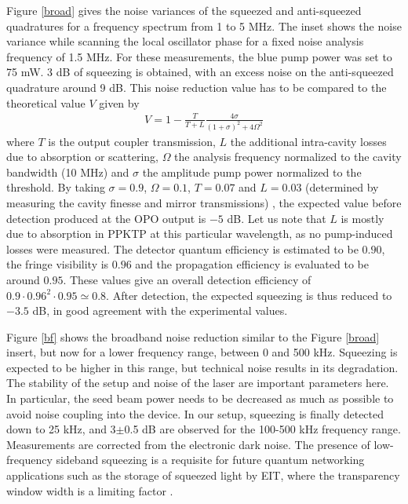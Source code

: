 Figure \ref{broad} gives the noise variances of the squeezed and anti-squeezed quadratures for a frequency spectrum from 1 to 5 MHz.  The inset shows the noise variance while
scanning the local oscillator phase for a fixed noise analysis frequency of 1.5 MHz. For these measurements, the blue pump power was set to 75 mW. 3 dB of
squeezing is obtained, with an excess noise on the anti-squeezed quadrature around 9 dB.  This noise reduction value has to be compared to the
theoretical value $V$ given by \cite{fabre,kimble}
\begin{eqnarray} V=1-\frac{T}{T+L}\frac{4\sigma}{(1+\sigma)^2+4\Omega^2} 
\end{eqnarray}
where $T$ is the output coupler transmission, $L$ the additional intra-cavity losses due to absorption or scattering, $\Omega$ the analysis frequency normalized to the cavity bandwidth (10 MHz) and $\sigma$ the amplitude pump power normalized to the threshold. By taking
$\sigma=0.9$, $\Omega=0.1$, $T=0.07$ and $L=0.03$ (determined by measuring the cavity finesse and mirror transmissions) , the
expected value before detection produced at the OPO output is $-5$ dB. Let us note that $L$ is mostly due to absorption in PPKTP at this particular wavelength, as no pump-induced losses were measured.  The detector quantum
efficiency is estimated to be $0.90$, the fringe visibility is $0.96$
and the propagation efficiency is evaluated to be around $0.95$. These
values give an overall detection efficiency of $0.9 \cdot
0.96^{2} \cdot 0.95\simeq0.8$. After detection, the expected squeezing
is thus reduced to $-3.5$ dB, in good agreement with the experimental values.






Figure \ref{bf} shows the broadband noise reduction similar to the Figure \ref{broad} insert, but now for a lower frequency range,
between 0 and 500 kHz. Squeezing is expected to be higher in this range, but technical noise results in its degradation. The stability of the setup and noise of the laser are important parameters here. In particular, the seed beam power needs to be decreased as much as possible to avoid noise coupling into the device. In our setup, squeezing is finally detected down to 25 kHz, and 3$\pm$0.5 dB are observed for the 100-500 kHz frequency range. Measurements are corrected from the electronic dark noise. The presence of low-frequency sideband squeezing is a requisite for future quantum networking applications such as the storage of squeezed light by EIT, where the transparency window width is a limiting factor \cite{honda, appel}.


